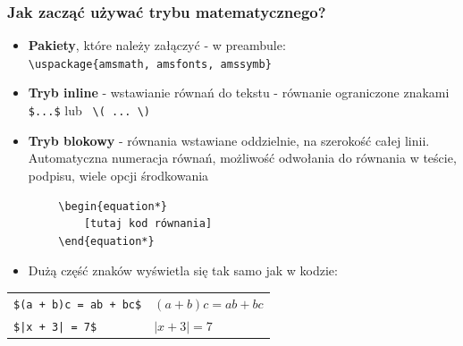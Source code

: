 \documentclass{beamer}
\theoremstyle{newblock}
\begin{document}
\begin{frame}[fragile=singleslide]
    \frametitle{Jak zacząć używać trybu matematycznego?}
    
    \begin{itemize}
        \item \textbf{Pakiety}, które należy załączyć -  w preambule:\\
        {\centering \verb|\uspackage{amsmath, amsfonts, amssymb}|}
        \item \textbf{Tryb inline} - wstawianie równań do tekstu - równanie ograniczone znakami \verb| $...$| lub \verb| \( ... \) |
        \item \textbf{Tryb blokowy} - równania wstawiane oddzielnie, na szerokość całej linii. Automatyczna numeracja równań, możliwość odwołania do równania w teście, podpisu, wiele opcji środkowania
    \end{itemize}
        
    \begin{verbatim}
        \begin{equation*}
            [tutaj kod równania]
        \end{equation*}
    \end{verbatim}

    
    \begin{itemize}
        \item Dużą część znaków wyświetla się tak samo jak w kodzie:
    \end{itemize}
        
    \centering
    \begin{tabular}{l|l}
        \verb|$(a + b)c = ab + bc$| & $(a + b)c = ab + bc$ \\
        \verb!$|x + 3| = 7$!& $|x + 3| = 7$ 
    \end{tabular}

\end{frame}


\newcommand\showmycounter{\addtocounter{cwiczenia}{1}\thecwiczenia}

\end{document}
